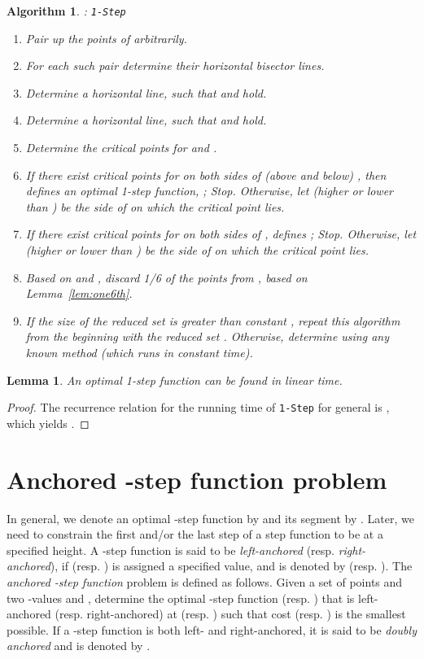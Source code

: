 \documentclass[preprint,10pt]{elsarticle}
\newtheorem{lemma}{Lemma}
\newtheorem{algorithm}{Algorithm}
\begin{document}
\begin{algorithm}{\rm :} {\tt 1-Step}
\begin{enumerate}
\item
Pair up the points of  arbitrarily.
\item
For each such pair  determine their horizontal bisector lines. 
\item
Determine a horizontal line,  such that 
and  hold.
\item
Determine a horizontal line,  such that   and
 hold.
\item
Determine the critical points for  and .
\item
If there exist critical points for  on both sides of (above and below) , 
then  defines an optimal 1-step function, ; Stop. 
Otherwise, let  (higher or lower than ) be the side of  on which the critical point
lies.
\item
If there exist critical points for  on both sides of ,
 defines ; Stop.
Otherwise, let  (higher or lower than ) be the side of  on which the critical point
lies.
\item
Based on  and , discard 1/6 of the points from ,
based on Lemma~\ref{lem:one6th}.
\item
If the size of the reduced set  is greater than constant , 
repeat this algorithm from the beginning with the reduced set .
Otherwise, determine  using any known method
(which runs in constant time).
\end{enumerate}
\end{algorithm}

\begin{lemma}\label{lem:1step}
An optimal 1-step function  can be found in linear time.
\end{lemma}
\begin{proof}
The recurrence relation for the running time  of {\tt 1-Step} for general  is 
,
which yields .
\end{proof}

\section{Anchored -step function problem}\label{sec:cond2step}
In general, we denote an optimal -step function by 
and its  segment by . 
Later, we need to constrain the first and/or the last step of a step function to be
at a specified height.
A -step function is said to be {\em left-anchored} (resp. {\em right-anchored}),
if  (resp.  ) is assigned a specified value,
and is denoted by  (resp. ).
The {\em anchored -step function} problem is defined as follows.
Given a set  of points and two -values  and ,
determine the optimal -step function   (resp. )
that is left-anchored (resp. right-anchored) at 
 (resp. ) such that cost  (resp. )
 is the smallest possible.
If a -step function is both left- and right-anchored, 
it is said to be {\em doubly anchored} and is
denoted by .
\end{document}
